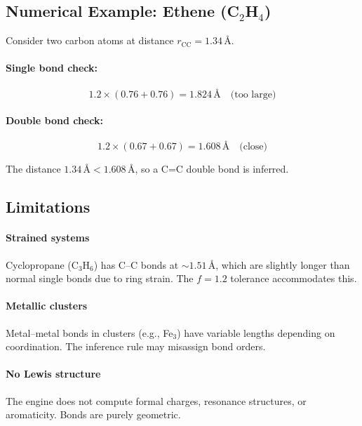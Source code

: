 \documentclass[11pt]{article}
\begin{document}
\subsection{Numerical Example: Ethene (C$_2$H$_4$)}

Consider two carbon atoms at distance $r_{\text{CC}} = 1.34$\,\AA.

\paragraph{Single bond check:}
\begin{equation}
1.2 \times (0.76 + 0.76) = 1.824\,\text{\AA} \quad \text{(too large)}
\end{equation}

\paragraph{Double bond check:}
\begin{equation}
1.2 \times (0.67 + 0.67) = 1.608\,\text{\AA} \quad \text{(close)}
\end{equation}

The distance $1.34$\,\AA $< 1.608$\,\AA, so a C=C double bond is inferred.

\subsection{Limitations}

\paragraph{Strained systems} Cyclopropane (C$_3$H$_6$) has C--C bonds at $\sim 1.51$\,\AA, which are slightly longer than normal single bonds due to ring strain. The $f = 1.2$ tolerance accommodates this.

\paragraph{Metallic clusters} Metal--metal bonds in clusters (e.g., Fe$_3$) have variable lengths depending on coordination. The inference rule may misassign bond orders.

\paragraph{No Lewis structure} The engine does not compute formal charges, resonance structures, or aromaticity. Bonds are purely geometric.
\end{document}
